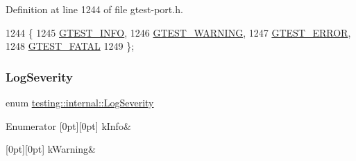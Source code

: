 Definition at line 1244 of file gtest-\/port.\+h.


\begin{DoxyCode}
1244                       \{
1245   \hyperlink{namespacetesting_1_1internal_aa6255ef3b023c5b4e1a2198d887fb977aff315e0913fcda86fe4de882bf5e33e9}{GTEST\_INFO},
1246   \hyperlink{namespacetesting_1_1internal_aa6255ef3b023c5b4e1a2198d887fb977a7a051bc2794f15a4bf0eab40562a304c}{GTEST\_WARNING},
1247   \hyperlink{namespacetesting_1_1internal_aa6255ef3b023c5b4e1a2198d887fb977a651e9cd2a904e0c8210536271b875f75}{GTEST\_ERROR},
1248   \hyperlink{namespacetesting_1_1internal_aa6255ef3b023c5b4e1a2198d887fb977a75063567740f6bf7da419b1b9197b12e}{GTEST\_FATAL}
1249 \};
\end{DoxyCode}
\mbox{\label{namespacetesting_1_1internal_a203d1a8a2147a53d12bbdae40d443914}} 
\subsubsection{\texorpdfstring{Log\+Severity}{LogSeverity}}
{\footnotesize\ttfamily enum \hyperlink{namespacetesting_1_1internal_a203d1a8a2147a53d12bbdae40d443914}{testing\+::internal\+::\+Log\+Severity}}

\begin{DoxyEnumFields}{Enumerator}
[0pt][0pt]{}\mbox{\label{namespacetesting_1_1internal_a203d1a8a2147a53d12bbdae40d443914a396aacfaee2849eaab7c1de9773d624d}} 
k\+Info&\\
\hline

[0pt][0pt]{}\mbox{\label{namespacetesting_1_1internal_a203d1a8a2147a53d12bbdae40d443914a5beeeab1b0a3caabd0afb43356c1a271}} 
k\+Warning&\\
\hline

\end{DoxyEnumFields}


